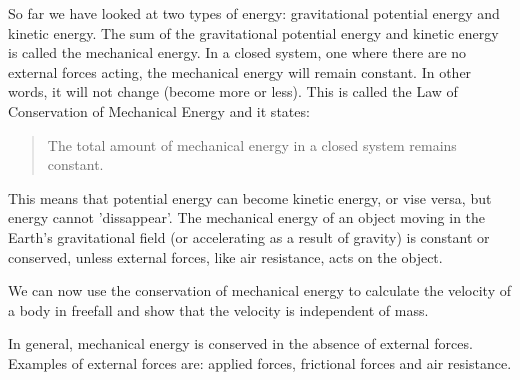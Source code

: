
So far we have looked at two types of energy: gravitational potential energy and kinetic energy. The sum of the gravitational potential energy and kinetic energy is called the mechanical energy. In a closed system, one where there are no external forces acting, the mechanical energy will remain constant. In other words, it will not change (become more or less). This is called the Law of Conservation of Mechanical Energy and it states:

\begin{quote}
The total amount of mechanical energy in a closed system remains constant. 
\end{quote}


This means that potential energy can become kinetic energy, or vise versa, but energy cannot 'dissappear'. The mechanical energy of an object moving in the Earth's gravitational field (or accelerating as a result of gravity) is constant or conserved, unless external forces, like air resistance, acts on the object.

We can now use the conservation of mechanical energy to calculate the velocity of a body in freefall and show that the velocity is independent of mass.




In general, mechanical energy is conserved in the absence of external forces. Examples of external forces are: applied forces, frictional forces and air resistance.

